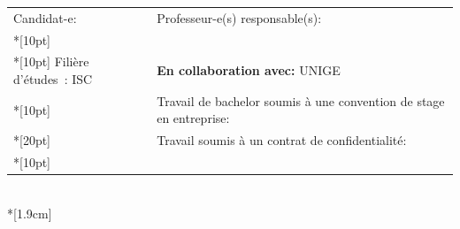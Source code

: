 \begin{spacing}{0.956}
\begin{center}
{
	\begin{tabular*}{16cm}{p{7.59cm} p{7.58cm}}
		\small Candidat-e:					&	\small Professeur-e(s) responsable(s):\\*[10pt]
		\small\textbf{\textsc{\Author}}		&	\small\textbf{\textsc{\Professor}}\\*[10pt]
		\footnotesize  Filière d’études : ISC	&	\footnotesize  \textbf{En collaboration avec:} UNIGE\\*[10pt]
		\footnotesize  {} & \footnotesize  Travail de bachelor soumis à une convention de stage en entreprise: \Convention\\*[20pt]
		\footnotesize  {} & \footnotesize  Travail soumis à un contrat de confidentialité: \Confidentiel\\*[10pt]
	\end{tabular*}\\*[1.9cm]
}
\end{center}
\end{spacing}
